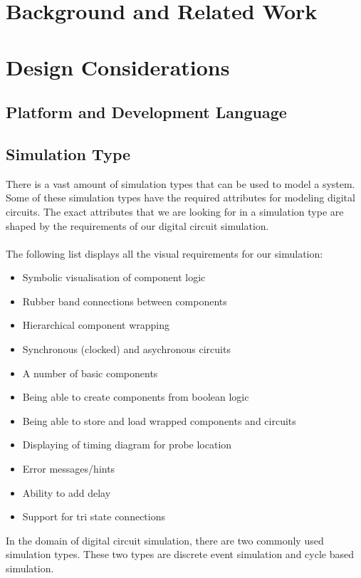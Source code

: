 \documentclass[twoside]{uva-inf-bachelor-thesis}
\begin{document}
\chapter{Background and Related Work}

\chapter{Design Considerations}
\section{Platform and Development Language}
\section{Simulation Type}
There is a vast amount of simulation types that can be used to model a system. Some of these simulation types have the required attributes for modeling digital circuits. The exact attributes that we are looking for in a simulation type are shaped by the requirements of our digital circuit simulation.
\\
\\
The following list displays all the visual requirements for our simulation:

\begin{itemize}
  \item Symbolic visualisation of component logic
  \item Rubber band connections between components
  \item Hierarchical component wrapping
  \item Synchronous (clocked) and asychronous circuits
  \item A number of basic components
  \item Being able to create components from boolean logic
  \item Being able to store and load wrapped components and circuits
  \item Displaying of timing diagram for probe location
  \item Error messages/hints
  \item Ability to add delay
  \item Support for tri state connections
\end{itemize}
$~$
\\
In the domain of digital circuit simulation, there are two commonly used simulation types. These two types are discrete event simulation and cycle based simulation.
\end{document}
